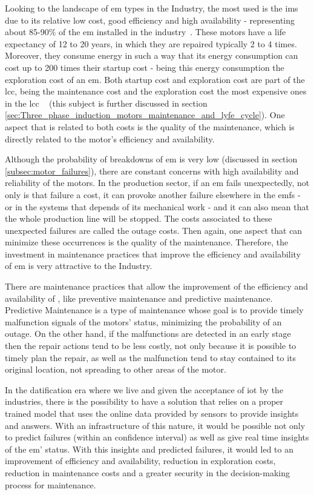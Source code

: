 Looking to the landscape of \acrlong{em} types in the Industry, the most used is the \acrfull{ims} due to its relative low cost, good efficiency and high availability - representing about 85-90\% of the \acrlong{em} installed in the industry~\cite{Ferreira1}. 
These motors have a life expectancy of 12 to 20 years, in which they are repaired typically 2 to 4 times. Moreover, they consume energy in such a way that its energy consumption can cost up to 200 times their startup cost - being this energy consumption the exploration cost of an \acrlong{em}.
Both startup cost and exploration cost are part of the \acrfull{lcc}, being the maintenance cost and the exploration cost the most expensive ones in the \acrshort{lcc} ~\cite{Ferreira1} (this subject is further discussed in section \ref{sec:Three_phase_induction_motors_maintenance_and_lyfe_cycle}). One aspect that is related to both costs is the quality of the maintenance, which is directly related to the motor's efficiency and availability. 

Although the probability of breakdowns of \acrlong{em} is very low (discussed in section \ref{subsec:motor_failures}), there are constant concerns with high availability and reliability of the motors.
In the production sector, if an \acrlong{em} fails unexpectedly, not only is that failure a cost, it can provoke another failure elsewhere in the  \acrshort{emfs} - or in the systems that depends of its mechanical work - and it can also mean that the whole production line will be stopped. The costs associated to these unexpected failures are called the outage costs. Then again, one aspect that can minimize these occurrences is the quality of the maintenance. Therefore, the investment in maintenance practices that improve the efficiency and availability of \acrlong{em} is very attractive to the Industry.

There are maintenance practices that allow the improvement of the efficiency and availability of , like preventive maintenance and predictive maintenance. 
Predictive Maintenance is a type of maintenance whose goal is to provide timely malfunction signals of the motors' status, minimizing the probability of an outage.  
On the other hand, if the malfunctions are detected in an early stage then the repair actions tend to be less costly, not only because it is possible to timely plan the repair, as well as the malfunction tend to stay contained to its original location, not spreading to other areas of the motor.


In the datification era where we live and given the acceptance of \acrfull{iot} by the industries, there is the possibility to have a solution that relies on a proper trained model that uses the online data provided by sensors to provide insights and answers. 
With an infrastructure of this nature, it would be possible not only to predict failures (within an confidence interval) as well as give real time insights of the \acrlong{em}' status. With this insights and predicted failures, it would led to an improvement of efficiency and availability, reduction in exploration costs, reduction in maintenance costs and a greater security in the decision-making process for maintenance.

